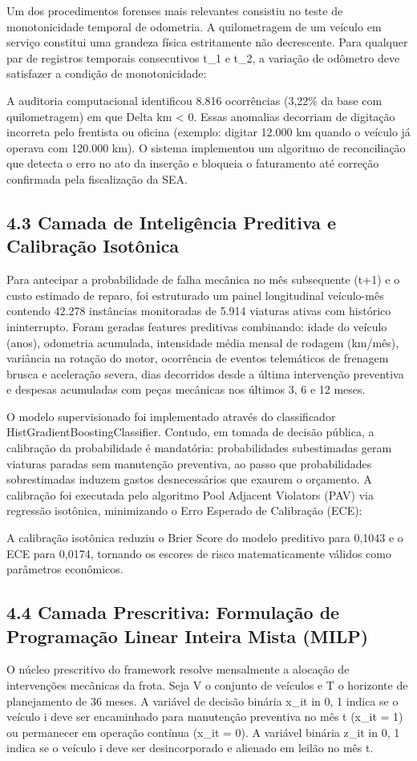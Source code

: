 \documentclass[10pt,a4paper,journal]{article}
\begin{document}
Um dos procedimentos forenses mais relevantes consistiu no teste de monotonicidade temporal de odometria. A quilometragem de um veículo em serviço constitui uma grandeza física estritamente não decrescente. Para qualquer par de registros temporais consecutivos t\_1 e t\_2, a variação de odômetro deve satisfazer a condição de monotonicidade:

A auditoria computacional identificou 8.816 ocorrências (3,22\% da base com quilometragem) em que Delta km < 0. Essas anomalias decorriam de digitação incorreta pelo frentista ou oficina (exemplo: digitar 12.000 km quando o veículo já operava com 120.000 km). O sistema implementou um algoritmo de reconciliação que detecta o erro no ato da inserção e bloqueia o faturamento até correção confirmada pela fiscalização da SEA.

\subsection{4.3 Camada de Inteligência Preditiva e Calibração Isotônica}
Para antecipar a probabilidade de falha mecânica no mês subsequente (t+1) e o custo estimado de reparo, foi estruturado um painel longitudinal veículo-mês contendo 42.278 instâncias monitoradas de 5.914 viaturas ativas com histórico ininterrupto. Foram geradas features preditivas combinando: idade do veículo (anos), odometria acumulada, intensidade média mensal de rodagem (km/mês), variância na rotação do motor, ocorrência de eventos telemáticos de frenagem brusca e aceleração severa, dias decorridos desde a última intervenção preventiva e despesas acumuladas com peças mecânicas nos últimos 3, 6 e 12 meses.

O modelo supervisionado foi implementado através do classificador HistGradientBoostingClassifier. Contudo, em tomada de decisão pública, a calibração da probabilidade é mandatória: probabilidades subestimadas geram viaturas paradas sem manutenção preventiva, ao passo que probabilidades sobrestimadas induzem gastos desnecessários que exaurem o orçamento. A calibração foi executada pelo algoritmo Pool Adjacent Violators (PAV) via regressão isotônica, minimizando o Erro Esperado de Calibração (ECE):

A calibração isotônica reduziu o Brier Score do modelo preditivo para 0,1043 e o ECE para 0,0174, tornando os escores de risco matematicamente válidos como parâmetros econômicos.

\subsection{4.4 Camada Prescritiva: Formulação de Programação Linear Inteira Mista (MILP)}
O núcleo prescritivo do framework resolve mensalmente a alocação de intervenções mecânicas da frota. Seja V o conjunto de veículos e T o horizonte de planejamento de 36 meses. A variável de decisão binária x\_{it} in {0, 1} indica se o veículo i deve ser encaminhado para manutenção preventiva no mês t (x\_{it} = 1) ou permanecer em operação contínua (x\_{it} = 0). A variável binária z\_{it} in {0, 1} indica se o veículo i deve ser desincorporado e alienado em leilão no mês t.
\end{document}
